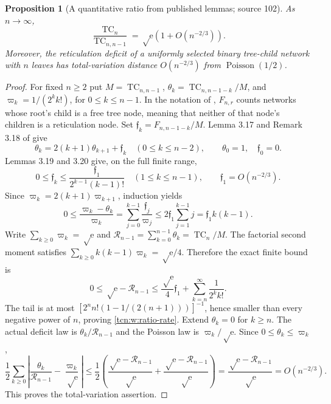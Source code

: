 \documentclass[11pt,letterpaper]{article}
\newcommand{\ee}{\mathrm e}
\newcommand{\TC}{\operatorname{TC}}
\newtheorem{proposition}[theorem]{Proposition}
\theoremstyle{remark}
\begin{document}
\begin{proposition}[A quantitative ratio from published lemmas; source 102]\label{tcn:w:prop:ratio-rate}
As $n\to\infty$,
\begin{equation}\label{tcn:w:ratio-rate}
 \frac{\TC_n}{\TC_{n,n-1}}=\sqrt\ee\left(1+O(n^{-2/3})\right).
\end{equation}
Moreover, the reticulation deficit of a uniformly selected binary tree-child network with $n$ leaves has total-variation distance $O(n^{-2/3})$ from $\operatorname{Poisson}(1/2)$.
\end{proposition}
\begin{proof}
For fixed $n\ge2$ put $M=\TC_{n,n-1}$, $\theta_k=\TC_{n,n-1-k}/M$, and $\varpi_k=1/(2^kk!)$, for $0\le k\le n-1$. In the notation of \cite{Chang2024}, $F_{n,r}$ counts networks whose root's child is a free tree node, meaning that neither of that node's children is a reticulation node. Set $\mathfrak f_k=F_{n,n-1-k}/M$. Lemma 3.17 and Remark 3.18 of \cite{Chang2024} give
\[
 \theta_k=2(k+1)\theta_{k+1}+\mathfrak f_k\quad(0\le k\le n-2),\qquad \theta_0=1,\quad \mathfrak f_0=0.
\]
Lemmas 3.19 and 3.20 give, on the full finite range,
\[
 0\le \mathfrak f_k\le\frac{\mathfrak f_1}{2^{k-1}(k-1)!}\quad(1\le k\le n-1),\qquad
 \mathfrak f_1=O(n^{-2/3}).
\]
Since $\varpi_k=2(k+1)\varpi_{k+1}$, induction yields
\[
 0\le\frac{\varpi_k-\theta_k}{\varpi_k}=\sum_{j=0}^{k-1}\frac{\mathfrak f_j}{\varpi_j}
        \le2\mathfrak f_1\sum_{j=1}^{k-1}j=\mathfrak f_1k(k-1).
\]
Write $\sum_{k\ge0}\varpi_k=\sqrt\ee$ and $\mathcal R_{n-1}=\sum_{k=0}^{n-1}\theta_k=\TC_n/M$.
The factorial second moment satisfies $\sum_{k\ge0}k(k-1)\varpi_k=\sqrt\ee/4$. Therefore the exact finite bound is
\begin{equation}\label{tcn:w:finite-deficit}
 0\le \sqrt\ee-\mathcal R_{n-1}\le\frac{\sqrt\ee}4\mathfrak f_1+\sum_{k=n}^{\infty}\frac1{2^kk!}.
\end{equation}
The tail is at most $[2^nn!(1-1/(2(n+1)))]^{-1}$, hence smaller than every negative power of $n$, proving \eqref{tcn:w:ratio-rate}. Extend $\theta_k=0$ for $k\ge n$. The actual deficit law is $\theta_k/\mathcal R_{n-1}$ and the Poisson law is $\varpi_k/\sqrt\ee$. Since $0\le \theta_k\le \varpi_k$,
\[
 \frac12\sum_{k\ge0}\left|\frac{\theta_k}{\mathcal R_{n-1}}-\frac{\varpi_k}{\sqrt\ee}\right|
 \le\frac12\left(\frac{\sqrt\ee-\mathcal R_{n-1}}{\sqrt\ee}+\frac{\sqrt\ee-\mathcal R_{n-1}}{\sqrt\ee}\right)
 =\frac{\sqrt\ee-\mathcal R_{n-1}}{\sqrt\ee}=O(n^{-2/3}).
\]
This proves the total-variation assertion.
\end{proof}
\end{document}
